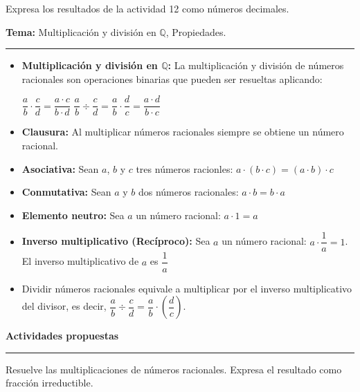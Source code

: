 \documentclass[spanish,letterpaper, 11pt, addpoints, answers]{exam}
\begin{document}
\begin{questions}
\begin{multicols}{2}
  \end{multicols}

  \question Expresa los resultados de la actividad 12 como números decimales.

  \newpage

  \parbox{6in}{
    \textbf{Tema:} Multiplicación y división en $\mathbb{Q}$, Propiedades.}
  \vspace{0.15in}
  \hrule

  \begin{itemize}
    \item \textbf{Multiplicación y división en $\mathbb{Q}$:} La multiplicación y división de números racionales son operaciones binarias que pueden ser resueltas aplicando:
          \begin{center}
            $\dfrac{a}{b}\cdot\dfrac{c}{d}=\dfrac{a\cdot c}{b\cdot d}$\hspace{1cm} $\dfrac{a}{b}\div\dfrac{c}{d}=\dfrac{a}{b}\cdot \dfrac{d}{c}=\dfrac{a\cdot d}{b\cdot c}$
          \end{center}

    \item \textbf{Clausura:} Al multiplicar números racionales siempre se obtiene un número racional.
    \item \textbf{Asociativa:} Sean $a$, $b$ y $c$ tres números racionles: $a\cdot(b\cdot c)=(a\cdot b)\cdot c$
    \item \textbf{Conmutativa:} Sean $a$ y $b$ dos números racionales: $a\cdot b=b\cdot a$
    \item \textbf{Elemento neutro:} Sea $a$ un número racional: $a\cdot 1=a$
    \item \textbf{Inverso multiplicativo (Recíproco):} Sea $a$ un número racional: $a\cdot \dfrac{1}{a}=1$. El inverso multiplicativo de $a$ es $\dfrac{1}{a}$
    \item Dividir números racionales equivale a multiplicar por el inverso multiplicativo del divisor, es decir, $\dfrac{a}{b}\div \dfrac{c}{d}=\dfrac{a}{b}\cdot \left(\dfrac{d}{c}\right)$.
  \end{itemize}

  \parbox{6in}{
    \textbf{Actividades propuestas}}
  \vspace{0.15in}
  \hrule


  \question Resuelve las multiplicaciones de números racionales. Expresa el resultado como fracción irreductible.


\end{questions}
\end{document}
